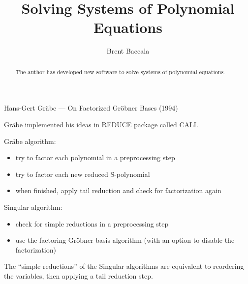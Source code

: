 \documentclass{article}
\title{Solving Systems of Polynomial Equations}
\author{Brent Baccala}
\begin{document}
\parindent 0pt

\maketitle

\begin{abstract}
The author has developed new software to solve systems of polynomial equations.
\end{abstract}


\parskip 12pt


Hans-Gert Gr\"abe --- On Factorized Gr\"obner Bases (1994)

Gr\"abe implemented his ideas in REDUCE package called CALI.

Gr\"abe algorithm:

\begin{itemize}
\item try to factor each polynomial in a preprocessing step
\item try to factor each new reduced S-polynomial
\item when finished, apply tail reduction and check for factorization again
\end{itemize}

Singular algorithm:

\begin{itemize}
\item check for simple reductions in a preprocessing step
\item use the factoring Gr\"obner basis algorithm (with an option to disable the factorization)
\end{itemize}

The ``simple reductions'' of the Singular algorithms are equivalent to reordering the variables,
then applying a tail reduction step.
\end{document}
